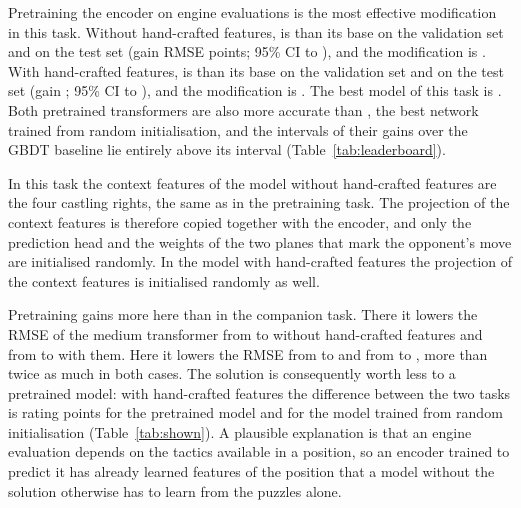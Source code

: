 \documentclass[11pt]{article}
\begin{document}
Pretraining the encoder on engine evaluations is the most effective
modification in this task. Without hand-crafted features,
 is
 than
its base on the validation set and
 on the
test set (gain 
RMSE points; 95\% CI
 to
), and
the modification is
. With
hand-crafted features,  is
than its base on the validation set and
on the test set (gain
;
95\% CI
to
),
and the modification is
.
The best model of this task is . Both pretrained transformers
are also more accurate than , the best network trained from
random initialisation, and the intervals of their gains over the GBDT
baseline lie entirely above its interval (Table~\ref{tab:leaderboard}).

In this task the context features of the model without hand-crafted features
are the four castling rights, the same as in the pretraining task. The
projection of the context features is therefore copied together with the
encoder, and only the prediction head and the weights of the two planes that
mark the opponent's move are initialised randomly. In the model with
hand-crafted features the projection of the context features is initialised
randomly as well.

\ifshown
Pretraining gains more here than in the companion task. There it lowers the
RMSE of the medium transformer from  to
 without hand-crafted features
and from  to
 with them. Here it lowers
the RMSE from  to
 and from
 to
, more than twice as much in
both cases. The solution is consequently worth less to a pretrained model:
with hand-crafted features the difference between the two tasks is
 rating points for the
pretrained model and  for the model
trained from random initialisation (Table~\ref{tab:shown}). A plausible
explanation is that an engine evaluation depends on the tactics available in
a position, so an encoder trained to predict it has already learned features
of the position that a model without the solution otherwise has to learn from
the puzzles alone.
\fi
\end{document}
